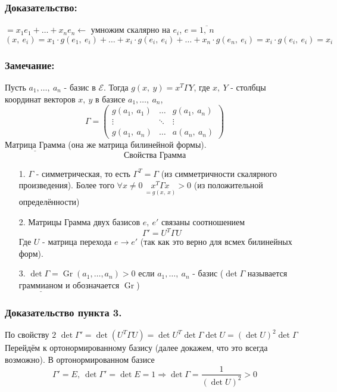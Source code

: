 \documentclass[12pt, letterpaper, twoside]{article}
\newcommand{\Underl}[1]{$\underline{\text{#1}}$}
\begin{document}
    \subsubsection*{Доказательство:}
    $ = x_1 e_1 + \dots + x_n e_n\leftarrow$ умножим скалярно на $e_i$, $e = \overline{1,\ n}$
    \[(x,\ e_i) = x_1\cdot g(e_1,\ e_i) + \dots + x_i\cdot g(e_i,\ e_i) + \dots + x_n\cdot g(e_n,\ e_i) = x_i\cdot g(e_i,\ e_i) = x_i\]
    \subsubsection*{Замечание:}
    Пусть $a_1,\dots,\ a_n$ - базис в $\mathcal{E}$. Тогда $g(x,\ y) = x^T\Gamma Y$, где $x,\ Y$ - столбцы координат векторов $x,\ y$ в базисе $a_1,\dots,\ a_n$,
    \[\Gamma = \begin{pmatrix}
        g(a_1,\ a_1) & \dots & g(a_1,\ a_n)\\
        \vdots & \ddots & \vdots\\
        g(a_1,\ a_n) & \dots & a(a_n,\ a_n)
    \end{pmatrix}\]
    \Underl{Матрица Грамма} (она же матрица билинейной формы).
    \[\text{Свойства Грамма}\]
    \begin{enumerate}
        \item[1.] $\Gamma$ - симметрическая, то есть $\Gamma^T = \Gamma$ (из симметричности скалярного произведения). Более того $\forall x\neq 0\ \underset{=g(x,\ x)}{x^T\Gamma x} > 0$ (из положительной определённости)
        \item[2.] Матрицы  Грамма двух базисов $e,\ e'$ связаны соотношением
        \[\Gamma' = U^T \Gamma U\]
        Где $U$ - матрица перехода $e\to e'$ (так как это верно для всмех билинейных форм).
        \item[3.] $\det \Gamma = \operatorname{Gr} (a_1,\dots, a_n) > 0$ если $a_1,\dots,\ a_n$ - базис ($\det \Gamma$ называется \Underl{граммианом} и обозначается $\operatorname{Gr}$)
    \end{enumerate}
    \subsubsection*{Доказательство пункта 3.}
    По свойству $2$ $\det \Gamma' = \det (U^T \Gamma U) = \det U^T \det \Gamma \det U = (\det U)^2\det \Gamma$\\
    Перейдём к ортонормированному базису (далее докажем, что это всегда возможно). В ортонормированном базисе
    \[\Gamma' = E,\ \det\Gamma' = \det E = 1\Rightarrow \det\Gamma = \frac{1}{(\det U)^2} > 0\]
\end{document}
